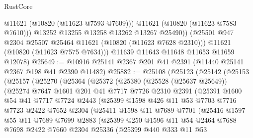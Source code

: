 \begin{lexlean}{RustCore}
\begin{coremodule}
                @11621
                (@10820 (@11623 @7593 @7609)))
              @11621
              (@10820 (@11623 @7583 @7610)))
            @13252
            @13255
            @13258
            @13262
            @13267
            @25490))
        (@25501 @947 @2304 @25507 @25464 @11621 (@10820 (@11623 @7628 @2310)))
        @11621
        (@10820 (@11623 @7575 @7634)))
      @11639
      @11643
      @11648
      @11653
      @11659
      @12078)
@25649 := @10916 @25141 @2367 @201 @41 @2391 (@11440 @25141 @2367 @198 @41 @2390 @11482)
@25882 := @25108
    (@25123
      (@25142
        (@25153
          (@25157
            (@25270
              (@25364
                (@25372
                  (@25380
                    (@25528 (@25637 @25649))
                    (@25274
                      @7647
                      @1601
                      @201
                      @41
                      @7717
                      @7726
                      @2310
                      @2391
                      (@25391
                        @1600
                        @54
                        @41
                        @7717
                        @7724
                        @2443
                        (@25399
                          @1598
                          @426
                          @11
                          @53
                          @7703
                          @7716
                          @7723
                          @2422
                          @7652
                          @2304
                          (@25411
                            @1598
                            @11
                            @7689
                            @7701
                            (@25416
                              @1597
                              @55
                              @11
                              @7689
                              @7699
                              @2883
                              (@25399
                                @250
                                @1596
                                @11
                                @54
                                @2464
                                @7688
                                @7698
                                @2422
                                @7660
                                @2304
                                @25336
                                (@25399
                                  @440
                                  @333
                                  @11
                                  @53

\end{coremodule}
\end{lexlean}
